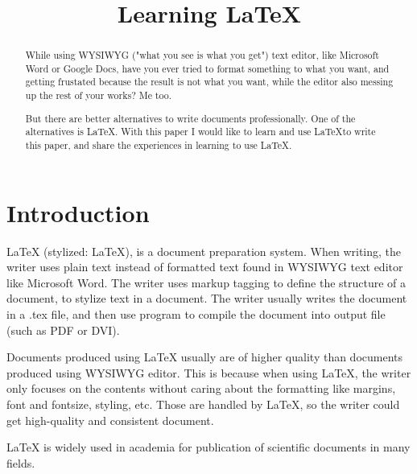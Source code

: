 \documentclass[conference]{IEEEtran}
\title{Learning \LaTeX}
\author{
    \IEEEauthorblockN{Ridho Pratama}
    \IEEEauthorblockA{
        Teknik Informatika\\
        Sekolah Teknik Elektro dan Informatika\\
        Institut Teknologi Bandung\\
        Bandung, Indonesia\\
        Email: p.ridho@students.itb.ac.id\\
    }
}
\begin{document}
\maketitle

\begin{abstract}
    While using WYSIWYG ("what you see is what you get") text editor,
    like Microsoft Word or Google Docs,
    have you ever tried to format something to what you want, and
    getting frustated because the result is not what you want, while the editor
    also messing up the rest of your works? Me too.

    But there are better alternatives to write documents professionally.
    One of the alternatives is \LaTeX.
    With this paper I would like to learn and use \LaTeX to write this paper,
    and share the experiences in learning to use \LaTeX.
\end{abstract}

\section{Introduction}
    LaTeX (stylized: \LaTeX), is a document preparation system. When writing,
    the writer uses plain text instead of formatted text found in WYSIWYG text
    editor like Microsoft Word. The writer uses markup tagging to define the 
    structure of a document, to stylize text in a document.
    The writer usually writes the document in a .tex file, and then use program
    to compile the document into output file (such as PDF or DVI).

    Documents produced using LaTeX usually are of higher quality than documents
    produced using WYSIWYG editor.
    This is because when using LaTeX, the writer only focuses on the contents
    without caring about the formatting like margins, font and fontsize,
    styling, etc. Those are handled by LaTeX, so the writer could get high-quality
    and consistent document.

    LaTeX is widely used in academia for publication of scientific documents
    in many fields.
\end{document}
